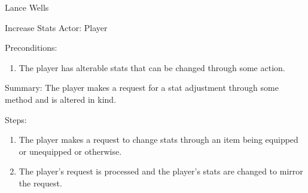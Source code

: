\documentclass[12pt]{report}
\begin{document}
\begin{section}{Lance Wells}
\begin{subsection}{Increase Stats}
Actor: Player

Preconditions:
\begin{enumerate}
\item The player has alterable stats that can be changed through some
action.
\end{enumerate}

Summary: The player makes a request for a stat adjustment through some
method and is altered in kind.

Steps:
\begin{enumerate}
\item The player makes a request to change stats through an item being
equipped or unequipped or otherwise.
\item The player's request is processed and the player's stats are changed
to mirror the request.
\end{enumerate}
\end{subsection}
\end{section}
\end{document}
